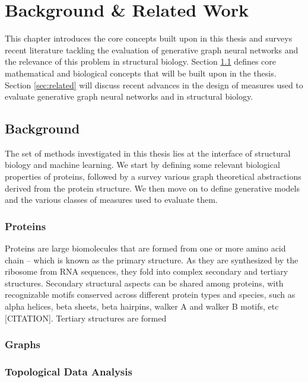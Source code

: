 \chapter{Background \& Related Work}

This chapter introduces the core concepts built upon in this thesis and surveys
recent literature tackling the evaluation of generative graph neural networks
and the relevance of this problem in structural biology. Section
\ref{sec:background} defines core mathematical and biological concepts that will
be built upon in the thesis. Section \ref{sec:related} will discuss recent
advances in the design of measures used to evaluate generative graph neural
networks and in structural biology.

\section{Background}\label{sec:background}

The set of methods investigated in this thesis lies at the interface of
structural biology and machine learning. We start by defining some relevant
biological properties of proteins, followed by a survey various graph theoretical
abstractions derived from the protein structure. We then move on to define
generative models and the various classes of measures used to evaluate them.

\subsection{Proteins}

Proteins are large biomolecules that are formed from one or more amino acid
chain -- which is known as the primary structure. As they are synthesized by the
ribosome from RNA sequences, they fold into complex secondary and tertiary
structures. Secondary structural aspects can be shared among proteins, with
recognizable motifs conserved across different protein types and species, such
as alpha helices, beta sheets, beta hairpins, walker A and walker B motifs, etc
[CITATION]. Tertiary structures are formed

\subsection{Graphs}

\subsection{Topological Data Analysis}

